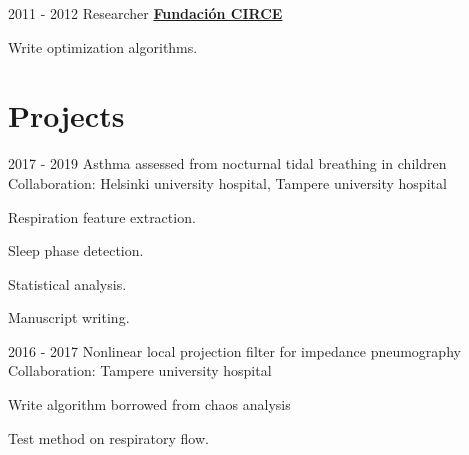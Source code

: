 \documentclass[letterpaper]{twentysecondcv} %
\begin{document}
\begin{RigthPage1}
\begin{twenty}
	\twentyitemlist
    	{2011 - 2012}
        {Researcher}
        {\href{https://http://www.fcirce.es//}{\textbf{Fundaci\'on CIRCE}}}
        {
        \item Write optimization algorithms.
        }
\end{twenty}

\section{Projects}
\begin{twenty} %
	\twentyitemlist
    	{2017 - 2019}
        {Asthma assessed from nocturnal tidal breathing in children~\cite{children,infants}}
        {\\Collaboration: Helsinki university hospital, Tampere university hospital }
        {
        \item Respiration feature extraction.
        \item Sleep phase detection.
        \item Statistical analysis.
        \item Manuscript writing.
        }
        

	\twentyitemlist
    	{2016 - 2017}
        {Nonlinear local projection filter for impedance pneumography~\cite{nlpf}}
        {\\Collaboration: Tampere university hospital }
        {
        \item Write algorithm borrowed from chaos analysis
        \item Test method on respiratory flow.
		}
       

\end{twenty}
\end{RigthPage1}
\end{document}
